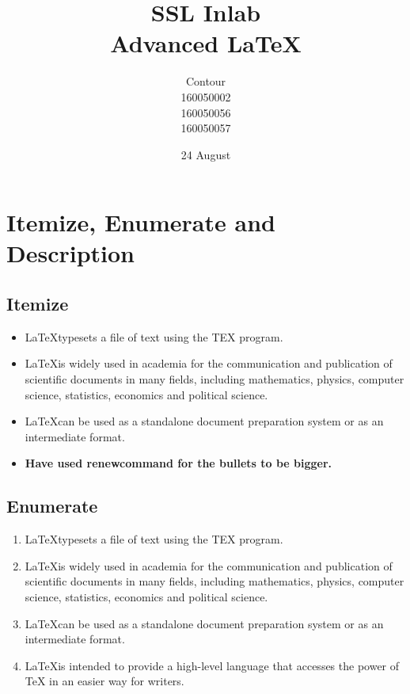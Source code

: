 \documentclass[titlepage,a4paper]{article}
\begin{document}
\title{ \textbf{SSL Inlab \\ Advanced \LaTeX} }
\author{ \huge{Contour} \\ \large{160050002} \\  \large{160050056} \\ \large{160050057} }
\date{24 August}
\maketitle

\tableofcontents

\newpage

\section{Itemize, Enumerate and Description}
\subsection{Itemize}
	\begin{itemize}
		\item \LaTeX typesets a file of text using the TEX program.
		\item \LaTeX is widely used in academia for the communication and publication
of scientific documents in many fields, including mathematics, physics,
computer science, statistics, economics and political science.
		\item \LaTeX can be used as a standalone document preparation system or as an
intermediate format.
		\item \textbf{Have used renewcommand for the bullets to be bigger.}
	\end{itemize}
\subsection{Enumerate}
	\begin{enumerate}
		\item \LaTeX typesets a file of text using the TEX program.
		\item \LaTeX is widely used in academia for the communication and publication
of scientific documents in many fields, including mathematics, physics,
computer science, statistics, economics and political science.
		\item \LaTeX can be used as a standalone document preparation system or as an
intermediate format.
		\item \LaTeX is intended to provide a high-level language that accesses the power
of TeX in an easier way for writers.
	\end{enumerate}
\end{document}
